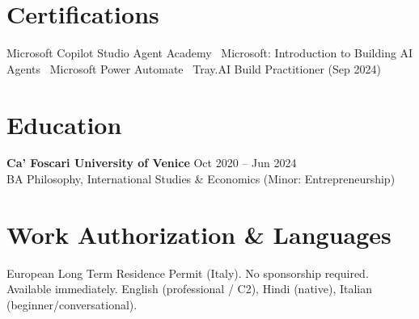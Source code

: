 \documentclass[a4paper,10pt]{article}
\begin{document}
\section{Certifications}
Microsoft Copilot Studio Agent Academy \textbullet\ Microsoft: Introduction to Building AI Agents \textbullet\ Microsoft Power Automate \textbullet\ Tray.AI Build Practitioner (Sep 2024)

\section{Education}
\textbf{Ca' Foscari University of Venice} \hfill Oct 2020 -- Jun 2024\\
BA Philosophy, International Studies \& Economics (Minor: Entrepreneurship)

\section{Work Authorization \& Languages}
European Long Term Residence Permit (Italy). No sponsorship required. Available immediately. English (professional / C2), Hindi (native), Italian (beginner/conversational).
\end{document}
